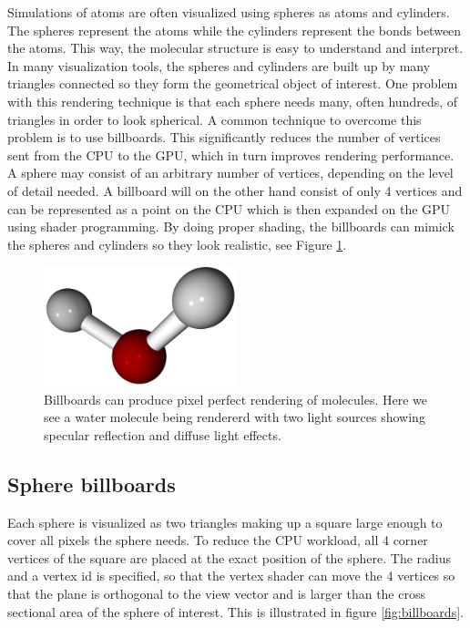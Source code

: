 \documentclass[aps,pre,twocolumn,letterpaper,floatfix]{revtex4}
\begin{document}
{Simulations of atoms are often visualized using spheres as atoms and cylinders.
The spheres represent the atoms while the cylinders represent the bonds between
the atoms.
This way, the molecular structure is easy to understand and interpret.
In many visualization tools, the spheres and cylinders are built up by many
triangles connected so they form the geometrical object of interest.
One problem with this rendering technique is that each sphere needs many,
often hundreds, of triangles in order to look spherical.
A common technique to overcome this problem is to use billboards.
This significantly reduces the number of vertices sent from the CPU to the GPU,
which in turn improves rendering performance.
A sphere may consist of an arbitrary number of vertices,
depending on the level of detail needed.
A billboard will on the other hand consist of only 4 vertices and can be
represented as a point on the CPU which is then expanded on the GPU using shader
programming.
By doing proper shading, the billboards can mimick the spheres and cylinders so
they look realistic, see Figure \ref{fig:final_billboards}.

\begin{figure}
	\centering
	\includegraphics[width=0.5\textwidth]{final_billboard.png}
	\caption{Billboards can produce pixel perfect rendering of molecules. Here we see a water molecule being rendererd with two light sources showing specular reflection and diffuse light effects.}
	\label{fig:final_billboards}
\end{figure}

\subsection{Sphere billboards}

Each sphere is visualized as two triangles making up a square large enough to
cover all pixels the sphere needs.
To reduce the CPU workload, all 4 corner vertices of the square are placed at
the exact position of the sphere.
The radius and a vertex id is specified, so that the vertex shader can move the
4 vertices so that the plane is orthogonal to the view vector and is larger than
the cross sectional area of the sphere of interest.
This is illustrated in figure \ref{fig:billboards}.

}
\end{document}
